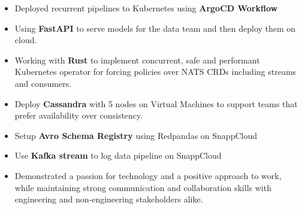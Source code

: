 \begin{itemize}
      \item Deployed recurrent pipelines to Kubernetes using \textbf{ArgoCD Workflow}
      \item Using \textbf{FastAPI} to serve models for the data team and then deploy them on cloud.
      \item Working with \textbf{Rust} to implement concurrent, safe and performant Kubernetes operator for forcing
            policies over NATS CRDs including streams and consumers.
      \item Deploy \textbf{Cassandra} with 5 nodes on Virtual Machines to support teams that prefer availability over consistency.
      \item Setup \textbf{Avro Schema Registry} using Redpandas on SnappCloud
      \item Use \textbf{Kafka stream} to log data pipeline on SnappCloud
      \item Demonstrated a passion for technology and a positive approach to work,
            while maintaining strong communication and collaboration skills with engineering
            and non-engineering stakeholders alike.
\end{itemize}

\vspace{0.5cm}

